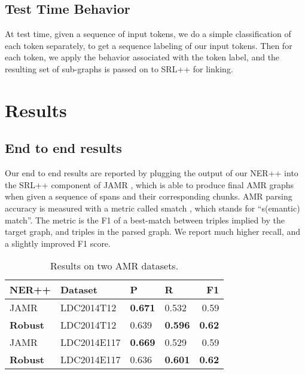 \documentclass[11pt]{article}
\begin{document}
\subsection{Test Time Behavior}

At test time, given a sequence of input tokens, we do a simple classification of each token separately, to get a sequence labeling of our input tokens. Then for each token, we apply the behavior associated with the token label, and the resulting set of sub-graphs is passed on to SRL++ for linking.

% 

\section{Results}

\subsection{End to end results}

Our end to end results are reported by plugging the output of our NER++ into the SRL++ component of JAMR \cite{key:2014flanigan-amr}, which is able to produce final AMR graphs when given a sequence of spans and their corresponding chunks. AMR parsing accuracy is measured with a metric called smatch \needcite, which stands for ``s(emantic) match''. The metric is the F1 of a best-match between triples implied by the target graph, and triples in the parsed graph. We report much higher recall, and a slightly improved F1 score.

\begin{table}[h]
\begin{center}
\begin{tabular}{|l|l|l|l|r|}
\hline NER++ & Dataset & P & R & \bf F1 \\ \hline
JAMR & LDC2014T12 & \textbf{0.671} & 0.532 & 0.59 \\
\textbf{Robust} & LDC2014T12 & 0.639 & \textbf{0.596} & \textbf{0.62} \\
JAMR & LDC2014E117 & \textbf{0.669} & 0.529 & 0.59 \\
\bf Robust & LDC2014E117 & 0.636 & \textbf{0.601} & \textbf{0.62} \\
\hline
\end{tabular}
\end{center}
\caption{\label{font-table} Results on two AMR datasets. }
\end{table}
\end{document}
